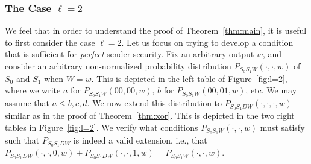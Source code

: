 \subsubsection{The Case $\ell = 2$}
We feel that in order to understand the proof of
Theorem~\ref{thm:main}, it is useful to first consider the case $\ell
= 2$. Let us focus on trying to develop a condition that is sufficient
for {\em perfect} sender-security. Fix an arbitrary output $w$, and
consider an arbitrary non-normalized probability distribution $P_{S_0
  S_1 W}(\cdot,\cdot,w)$ of $S_0$ and $S_1$ when $W = w$. This is
depicted in the left table of Figure~\ref{fig:l=2}, where we write $a$
for $P_{S_0 S_1 W}(00,00,w)$, $b$ for $P_{S_0 S_1 W}(00,01,w)$, etc.
We may assume that $a \leq b,c,d$. We now extend this distribution to
$P_{S_0 S_1 D W}(\cdot,\cdot,\cdot,w)$ similar as in the proof of
Theorem~\ref{thm:xor}. This is depicted in the two right tables in
Figure~\ref{fig:l=2}. We verify what conditions $P_{S_0 S_1
  W}(\cdot,\cdot,w)$ must satisfy such that $P_{S_0 S_1 D W}$ is
indeed a valid extension, i.e., that $P_{S_0 S_1 D
  W}(\cdot,\cdot,0,w)+P_{S_0 S_1 D W}(\cdot,\cdot,1,w)=P_{S_0 S_1
  W}(\cdot,\cdot,w)$.


\def\noex#1{\makebox[0ex]{$#1$}}
\def\m{\! - \!}

